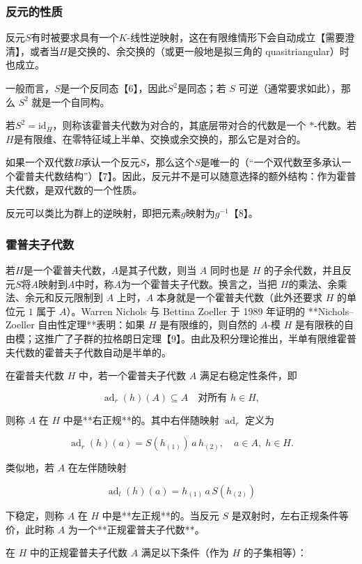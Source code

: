 \subsubsection{反元的性质}
反元$S$有时被要求具有一个$K$-线性逆映射，这在有限维情形下会自动成立【需要澄清】，或者当$H$是交换的、余交换的（或更一般地是拟三角的 quasitriangular）时也成立。

一般而言，$S$是一个反同态【6】，因此$S^2$是同态；若 $S$ 可逆（通常要求如此），那么 $S^2$ 就是一个自同构。

若$S^2 = \mathrm{id}_H$，则称该霍普夫代数为对合的，其底层带对合的代数是一个 $*$-代数。若$H$是有限维、在零特征域上半单、交换或余交换的，那么它是对合的。

如果一个双代数$B$承认一个反元$S$，那么这个$S$是唯一的（“一个双代数至多承认一个霍普夫代数结构”）【7】。因此，反元并不是可以随意选择的额外结构：作为霍普夫代数，是双代数的一个性质。

反元可以类比为群上的逆映射，即把元素$g$映射为$g^{-1}$【8】。
\subsubsection{霍普夫子代数}
若$H$是一个霍普夫代数，$A$是其子代数，则当 $A$ 同时也是 $H$ 的子余代数，并且反元$S$将$A$映射到$A$中时，称$A$为一个霍普夫子代数。换言之，当把 $H$的乘法、余乘法、余元和反元限制到 $A$ 上时，$A$ 本身就是一个霍普夫代数（此外还要求 $H$ 的单位元 $1$ 属于 $A$）。Warren Nichols 与 Bettina Zoeller 于 1989 年证明的 **Nichols–Zoeller 自由性定理**表明：如果 $H$ 是有限维的，则自然的 $A$-模 $H$ 是有限秩的自由模；这推广了子群的拉格朗日定理【9】。由此及积分理论推出，半单有限维霍普夫代数的霍普夫子代数自动是半单的。

在霍普夫代数 $H$ 中，若一个霍普夫子代数 $A$ 满足右稳定性条件，即

$$
\operatorname{ad}_r(h)(A) \subseteq A \quad \text{对所有 } h \in H,
$$

则称 $A$ 在 $H$ 中是**右正规**的。其中右伴随映射 $\operatorname{ad}_r$ 定义为

$$
\operatorname{ad}_r(h)(a) = S(h_{(1)})\, a \, h_{(2)}, \quad a \in A, \; h \in H.
$$

类似地，若 $A$ 在左伴随映射

$$
\operatorname{ad}_l(h)(a) = h_{(1)}\, a \, S(h_{(2)})
$$

下稳定，则称 $A$ 在 $H$ 中是**左正规**的。当反元 $S$ 是双射时，左右正规条件等价，此时称 $A$ 为一个**正规霍普夫子代数**。

在 $H$ 中的正规霍普夫子代数 $A$ 满足以下条件（作为 $H$ 的子集相等）：


